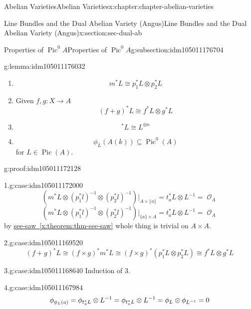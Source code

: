 \documentclass[oneside,10pt,]{book}
\newcommand{\qedhere}{\relax}
\numberwithin{equation}{section}
\newcommand{\sheaf}[1]{\operatorname{\mathcal{#1}}}
\DeclareMathOperator{\Pic}{Pic}
\begin{document}
\begin{chapterptx}{Abelian Varieties}{}{Abelian Varieties}{}{}{x:chapter:chapter-abelian-varieties}
\begin{sectionptx}{Line Bundles and the Dual Abelian Variety (Angus)}{}{Line Bundles and the Dual Abelian Variety (Angus)}{}{}{x:section:sec-dual-ab}
\begin{subsectionptx}{Properties of \(\Pic^0 A\)}{}{Properties of \(\Pic^0 A\)}{}{}{g:subsection:idm105011176704}
\begin{lemma}{}{}{g:lemma:idm105011176032}
\begin{enumerate}
\item{}%
\begin{equation*}
m^* L \cong p_1^* L\otimes p_2^* L
\end{equation*}
%
\item{}Given \(f,g \colon X \to A\)%
\begin{equation*}
(f+g)^* L \cong f^* L \otimes g^* L
\end{equation*}
%
\item{}%
\begin{equation*}
[n]^* L \cong L^{\otimes n}
\end{equation*}
%
\item{}%
\begin{equation*}
\phi_L(A(k)) \subseteq \Pic^0(A)
\end{equation*}
for \(L \in \Pic (A)\).%
\end{enumerate}
%
\end{lemma}
\begin{proofptx}{}{g:proof:idm105011172128}
\begin{case}{}{1.}{g:case:idm105011172000}
%
\begin{equation*}
(m^*L\otimes (p_1^*l)^{-1} \otimes (p_2^*l)^{-1})|_{A\times\{a\}} = t_a^*L \otimes L^{-1} = \sheaf O_A
\end{equation*}
%
\begin{equation*}
(m^*L\otimes (p_1^*l)^{-1} \otimes (p_2^*l)^{-1})|_{\{a\}\times A} = t_a^*L \otimes L^{-1} = \sheaf O_A
\end{equation*}
by \hyperref[x:theorem:thm-see-saw]{see-saw~\ref{x:theorem:thm-see-saw}} whole thing is trivial on \(A\times A\).%
\end{case}
\begin{case}{}{2.}{g:case:idm105011169520}
%
\begin{equation*}
(f+g)^*L\cong (f\times g)^* m^*L \cong (f\times g)^*(p_1^*L \otimes p_2^*L) \cong f^*L \otimes g^*L
\end{equation*}
%
\end{case}
\begin{case}{}{3.}{g:case:idm105011168640}
Induction of 3.%
\end{case}
\begin{case}{}{4.}{g:case:idm105011167984}
%
\begin{equation*}
\phi_{\phi_L(a)} = \phi_{t^*_a L}\otimes L^{-1} = \phi _{t_a^*L}\otimes L^{-1} = \phi_L \otimes \phi_{L^{-1}} = 0\qedhere
\end{equation*}
%
\end{case}

\end{proofptx}
\end{subsectionptx}
\end{sectionptx}
\end{chapterptx}
\end{document}
